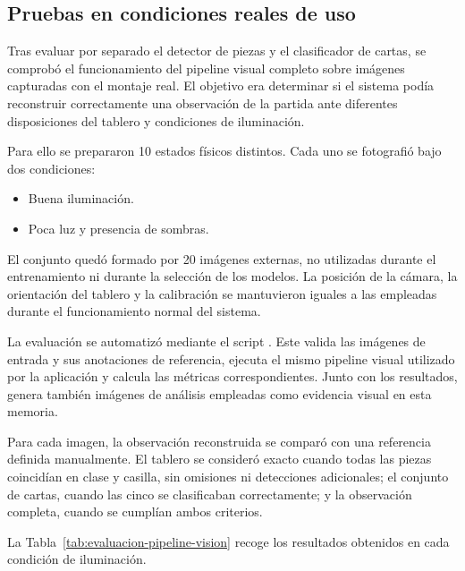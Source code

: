 \subsection{Pruebas en condiciones reales de uso}
\label{subsec:evaluacion-condiciones-reales}

Tras evaluar por separado el detector de piezas y el clasificador de cartas, se comprobó el funcionamiento del pipeline visual completo sobre imágenes capturadas con el montaje real. El objetivo era determinar si el sistema podía reconstruir correctamente una observación de la partida ante diferentes disposiciones del tablero y condiciones de iluminación.

Para ello se prepararon 10 estados físicos distintos. Cada uno se fotografió bajo dos condiciones:

\begin{itemize}
    \item Buena iluminación.
    \item Poca luz y presencia de sombras.
\end{itemize}

El conjunto quedó formado por 20 imágenes externas, no utilizadas durante el entrenamiento ni durante la selección de los modelos. La posición de la cámara, la orientación del tablero y la calibración se mantuvieron iguales a las empleadas durante el funcionamiento normal del sistema.

La evaluación se automatizó mediante el script
. Este valida las imágenes de entrada y sus anotaciones de referencia, ejecuta el mismo pipeline visual utilizado por la aplicación y calcula las métricas correspondientes. Junto con los resultados, genera también imágenes de análisis empleadas como evidencia visual en esta memoria.

Para cada imagen, la observación reconstruida se comparó con una referencia definida manualmente. El tablero se consideró exacto cuando todas las piezas coincidían en clase y casilla, sin omisiones ni detecciones adicionales; el conjunto de cartas, cuando las cinco se clasificaban correctamente; y la observación completa, cuando se cumplían ambos criterios.

La Tabla~\ref{tab:evaluacion-pipeline-vision} recoge los resultados obtenidos en cada condición de iluminación.


